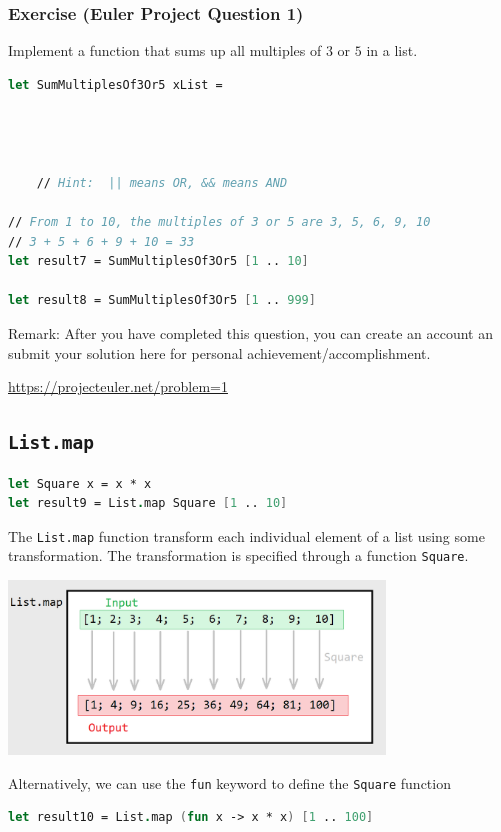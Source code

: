 \documentclass[12pt]{article}
\begin{document}
\subsubsection*{Exercise (Euler Project Question 1)}
Implement a function that sums up all multiples of $3$ or $5$ in a list.

\begin{lstlisting}[language=FSharp]
let SumMultiplesOf3Or5 xList =




    // Hint:  || means OR, && means AND

// From 1 to 10, the multiples of 3 or 5 are 3, 5, 6, 9, 10
// 3 + 5 + 6 + 9 + 10 = 33
let result7 = SumMultiplesOf3Or5 [1 .. 10]

let result8 = SumMultiplesOf3Or5 [1 .. 999]
\end{lstlisting}

Remark: After you have completed this question, you can create an account an submit your solution here for personal achievement/accomplishment.

\url{https://projecteuler.net/problem=1}

\pagebreak

\subsection{\texttt{List.map}}

\begin{lstlisting}[language=FSharp]
let Square x = x * x
let result9 = List.map Square [1 .. 10]
\end{lstlisting}
The \texttt{List.map} function transform each individual element of a list using some transformation. The transformation is specified through a function \texttt{Square}.
\begin{center}
\includegraphics[width=10cm]{pictures/picture28.png}
\end{center}   
Alternatively, we can use the \texttt{fun} keyword to define the \texttt{Square} function
\begin{lstlisting}[language=FSharp]
let result10 = List.map (fun x -> x * x) [1 .. 100]
\end{lstlisting}
\end{document}
